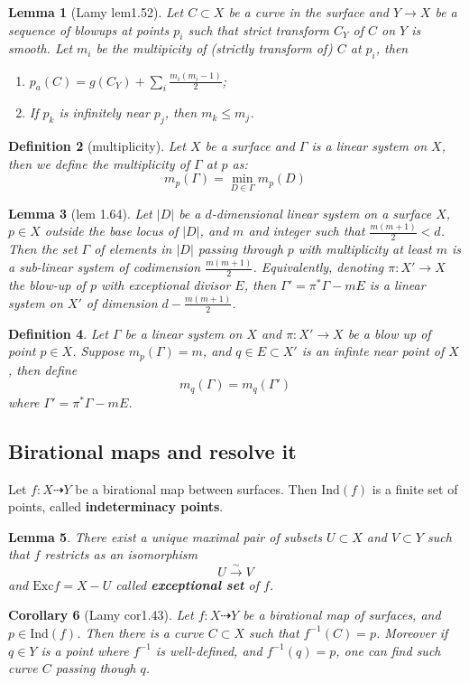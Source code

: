 \documentclass{article}
\newtheorem{defn}{Definition}[section]
\newtheorem{lem}[defn]{Lemma}
\newtheorem{cor}[defn]{Corollary}
\begin{document}
\begin{lem}[Lamy lem1.52]
  Let $ C\subset X $ be a curve in the surface and $ Y\to X $ be a sequence of blowups at points $ p_i $ such that strict transform $ C_Y $ of $ C $ on $ Y $ is smooth. Let $ m_i $ be the multipicity of (strictly transform of) $ C $ at $ p_i $, then 
  \begin{enumerate}
    \item $ p_a(C)=g(C_Y)+\sum_i\frac{m_i(m_i-1)}{2} $;
    \item If $ p_k $ is infinitely near $ p_j $, then $ m_k\leqslant m_j $.
  \end{enumerate}
\end{lem}
\begin{defn}[multiplicity]
  Let $ X $ be a surface and $ \Gamma $ is a linear system on $ X $, then we define the multiplicity of $ \Gamma $ at $ p $ as:
  \[ m_p(\Gamma)=\min_{D\in \Gamma}m_p(D) \]
\end{defn}
\begin{lem}[lem 1.64]
  Let $ |D| $ be a $ d $-dimensional linear system on a surface $ X $, $ p \in X $ outside the base locus of $ |D| $, and $ m $ and integer such that $ \frac{m(m + 1)}{2} < d $. Then the set $ \Gamma $ of elements in $ |D| $ passing through $ p $ with multiplicity at least $ m $ is a sub-linear system of codimension $ \frac{m(m+1)}{2} $. Equivalently, denoting $ \pi: X'\to X $ the blow-up of $ p $ with exceptional divisor $ E $, then $ \Gamma'= \pi^*\Gamma-mE $ is a linear system on $ X' $ of dimension $ d-\frac{m(m+1)}{2} $.
\end{lem}
\begin{defn}
  Let $ \Gamma $ be a linear system on $ X $ and $ \pi:X'\to X $ be a blow up of point $ p\in X $. Suppose $ m_p(\Gamma)=m $, and $ q\in E\subset X' $ is an infinte near point of $ X $, then define
  \[ m_q(\Gamma)=m_q(\Gamma') \] 
  where $ \Gamma'=\pi^*\Gamma-mE  $.
\end{defn}
\subsection{Birational maps and resolve it}

Let $ f:X\dashrightarrow Y $ be a birational map between surfaces. Then $ \mathrm{Ind}(f) $ is a finite set of points, called \textbf{indeterminacy points}.
\begin{lem}
There exist a unique maximal pair of subsets $ U\subset X $ and $ V\subset Y $ such that $ f $ restricts as an isomorphism
\[ U\xrightarrow{\sim} V \]
and $ \mathrm{Exc}f=X-U $ called \textbf{exceptional set} of $ f $.
\end{lem}
\begin{cor}[Lamy cor1.43]
  Let $ f:X\dashrightarrow Y $ be a birational map of surfaces, and $ p\in \mathrm{Ind}(f) $. Then there is a curve $ C\subset X $ such that $ f^{-1}(C)=p $. Moreover if $ q\in Y $ is a point where $ f^{-1} $ is well-defined, and $ f^{-1}(q)=p $, one can find such curve $ C $ passing though $ q $.
\end{cor}
\end{document}

